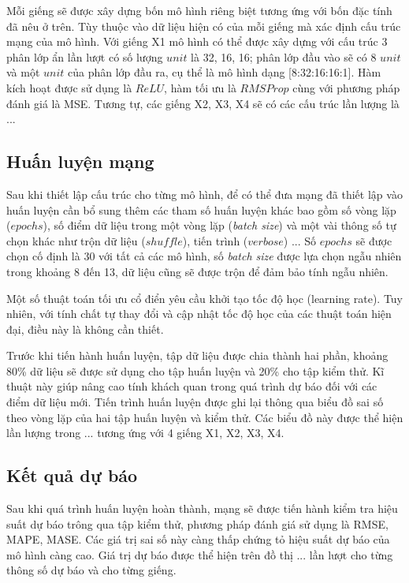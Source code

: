 \documentclass[12pt,a4paper]{report}
\begin{document}
Mỗi giếng sẽ được xây dựng bốn mô hình riêng biệt tương ứng với bốn đặc tính đã nêu ở trên. Tùy thuộc vào dữ liệu hiện có của mỗi giếng mà xác định cấu trúc mạng của mô hình. Với giếng X1 mô hình có thể được xây dựng với cấu trúc 3 phân lớp ẩn lần lượt có số lượng $unit$ là 32, 16, 16; phân lớp đầu vào sẽ có 8 $unit$ và một $unit$ của phân lớp đầu ra, cụ thể là mô hình dạng [8:32:16:16:1]. Hàm kích hoạt được sử dụng là $ReLU$, hàm tối ưu là $RMSProp$ cùng với phương pháp đánh giá là MSE. Tương tự, các giếng X2, X3, X4 sẽ có các cấu trúc lần lượng là ...\\

\subsection{Huấn luyện mạng}
Sau khi thiết lập cấu trúc cho từng mô hình, để có thể đưa mạng đã thiết lập vào huấn luyện cần bổ sung thêm các tham số huấn luyện khác bao gồm số vòng lặp ($epochs$), số điểm dữ liệu trong một vòng lặp (\textit{batch size}) và một vài thông số tự chọn khác như trộn dữ liệu ($shuffle$), tiến trình ($verbose$) ... Số $epochs$ sẽ được chọn cố định là 30 với tất cả các mô hình, số \textit{batch size} được lựa chọn ngẫu nhiên trong khoảng 8 đến 13, dữ liệu cũng sẽ được trộn để đảm bảo tính ngẫu nhiên.

Một số thuật toán tối ưu cổ điển yêu cầu khởi tạo tốc độ học (learning rate). Tuy nhiên, với tính chất tự thay đổi và cập nhật tốc độ học của các thuật toán hiện đại, điều này là không cần thiết.

Trước khi tiến hành huấn luyện, tập dữ liệu được chia thành hai phần, khoảng 80\% dữ liệu sẽ được sử dụng cho tập huấn luyện và 20\% cho tập kiểm thử. Kĩ thuật này giúp nâng cao tính khách quan trong quá trình dự báo đối với các điểm dữ liệu mới. Tiến trình huấn luyện được ghi lại thông qua biểu đồ sai số theo vòng lặp của hai tập huấn luyện và kiểm thử. Các biểu đồ này được thể hiện lần lượng trong ... tương ứng với 4 giếng X1, X2, X3, X4.\\

\subsection{Kết quả dự báo}
Sau khi quá trình huấn luyện hoàn thành, mạng sẽ được tiến hành kiểm tra hiệu suất dự báo trông qua tập kiểm thử, phương pháp đánh giá sử dụng là RMSE, MAPE, MASE. Các giá trị sai số này càng thấp chứng tỏ hiệu suất dự báo của mô hình càng cao. Giá trị dự báo được thể hiện trên đồ thị ... lần lượt cho từng thông số dự báo và cho từng giếng.
\end{document}
